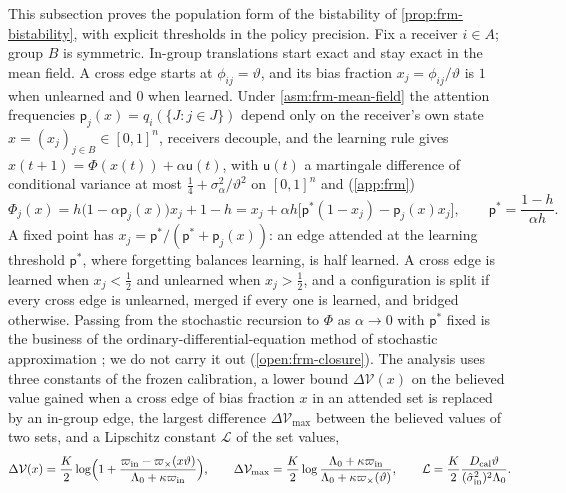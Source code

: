 This subsection proves the population form of the bistability of \cref{prop:frm-bistability}, with explicit thresholds in the policy precision. Fix a receiver $i\in A$; group $B$ is symmetric. In-group translations start exact and stay exact in the mean field. A cross edge starts at $\phi_{ij}=\vartheta$, and its bias fraction $x_j=\phi_{ij}/\vartheta$ is $1$ when unlearned and $0$ when learned. Under \cref{asm:frm-mean-field} the attention frequencies $\mathsf p_j(x)=q_i(\{J:j\in J\})$ depend only on the receiver's own state $x=(x_j)_{j\in B}\in[0,1]^n$, receivers decouple, and the learning rule gives $x(t+1)=\Phi(x(t))+\alpha\mathsf u(t)$, with $\mathsf u(t)$ a martingale difference of conditional variance at most $\frac14+\sigma_\alpha^2/\vartheta^2$ on $[0,1]^n$ and (\cref{app:frm})
\begin{equation}\label{eq:frm-meanfield}
\Phi_j(x)=h\bigl(1-\alpha\mathsf p_j(x)\bigr)x_j+1-h=x_j+\alpha h\bigl[\mathsf p^\ast(1-x_j)-\mathsf p_j(x)x_j\bigr],\qquad\mathsf p^\ast=\frac{1-h}{\alpha h}.
\end{equation}
A fixed point has $x_j=\mathsf p^\ast/(\mathsf p^\ast+\mathsf p_j(x))$: an edge attended at the learning threshold $\mathsf p^\ast$, where forgetting balances learning, is half learned. A cross edge is learned when $x_j<\frac12$ and unlearned when $x_j>\frac12$, and a configuration is split if every cross edge is unlearned, merged if every one is learned, and bridged otherwise. Passing from the stochastic recursion to $\Phi$ as $\alpha\to0$ with $\mathsf p^\ast$ fixed is the business of the ordinary-differential-equation method of stochastic approximation \citep{benaim1999dynamics,kushner1997stochastic}; we do not carry it out (\cref{open:frm-closure}). The analysis uses three constants of the frozen calibration, a lower bound $\Delta\mathcal V(x)$ on the believed value gained when a cross edge of bias fraction $x$ in an attended set is replaced by an in-group edge, the largest difference $\Delta\mathcal V_{\max}$ between the believed values of two sets, and a Lipschitz constant $\mathcal L$ of the set values,
\begin{equation*}
\Delta\mathcal V(x)=\frac K2\log\Bigl(1+\frac{\varpi_{\mathrm{in}}-\varpi_\times(x\vartheta)}{\Lambda_0+\kappa\varpi_{\mathrm{in}}}\Bigr),\qquad\Delta\mathcal V_{\max}=\frac K2\log\frac{\Lambda_0+\kappa\varpi_{\mathrm{in}}}{\Lambda_0+\kappa\varpi_\times(\vartheta)},\qquad\mathcal L=\frac K2\frac{D_{\mathrm{cal}}\vartheta}{(\hat\sigma^2_{\mathrm{in}})^2\Lambda_0}.
\end{equation*}

